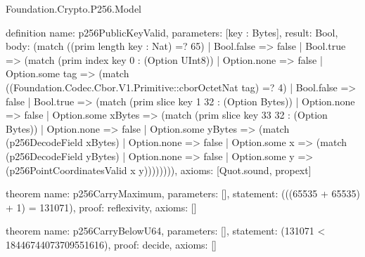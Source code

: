 \begin{lexlean}{Foundation.Crypto.P256.Model}
\begin{semanticmodule}
definition{
  name: p256PublicKeyValid,
  parameters: [key : Bytes],
  result: Bool,
  body: (match ((prim length key : Nat) =? 65)
    | Bool.false => false
    | Bool.true => (match (prim index key 0 : (Option UInt8))
      | Option.none => false
      | Option.some tag => (match ((Foundation.Codec.Cbor.V1.Primitive::cborOctetNat tag) =? 4)
        | Bool.false => false
        | Bool.true => (match (prim slice key 1 32 : (Option Bytes))
          | Option.none => false
          | Option.some xBytes => (match (prim slice key 33 32 : (Option Bytes))
            | Option.none => false
            | Option.some yBytes => (match (p256DecodeField xBytes)
              | Option.none => false
              | Option.some x => (match (p256DecodeField yBytes)
                | Option.none => false
                | Option.some y => (p256PointCoordinatesValid x y)))))))),
  axioms: [Quot.sound, propext]
}

theorem{
  name: p256CarryMaximum,
  parameters: [],
  statement: (((65535 + 65535) + 1) = 131071),
  proof: reflexivity{},
  axioms: []
}

theorem{
  name: p256CarryBelowU64,
  parameters: [],
  statement: (131071 < 18446744073709551616),
  proof: decide{},
  axioms: []
}
\end{semanticmodule}
\end{lexlean}
